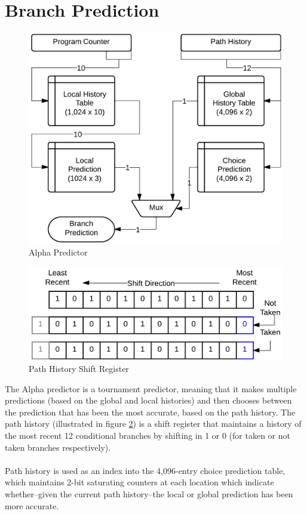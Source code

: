 \documentclass[twocolumn]{article}
\newcommand{\centerimage}[3]{
\begin{figure}[ht!]  
\begin{center} #1
\caption{#2}
\label{#3}
\end{center}
\end{figure}}
\begin{document}
\section{Branch Prediction}\centerimage{\includegraphics[width=\columnwidth]{img/alpha.png}}{Alpha Predictor}{alpha}\centerimage{\includegraphics[width=\columnwidth]{img/phistory.png}}{Path History Shift Register}{phistory}
The Alpha predictor is a tournament predictor, meaning that it makes multiple predictions (based on the global and local histories) and then chooses between the prediction that has  been the most accurate, based on the path history.  The path history (illustrated in figure \ref{phistory}) is a shift register that maintains a history of the most recent 12 conditional branches by shifting in 1 or 0 (for taken or not taken branches respectively).\\\\
Path history is used as an index into the 4,096-entry choice prediction table, which maintains 2-bit saturating counters at each location which indicate whether--given the current path history--the local or global prediction has been more accurate.\\\\  
\end{document}
